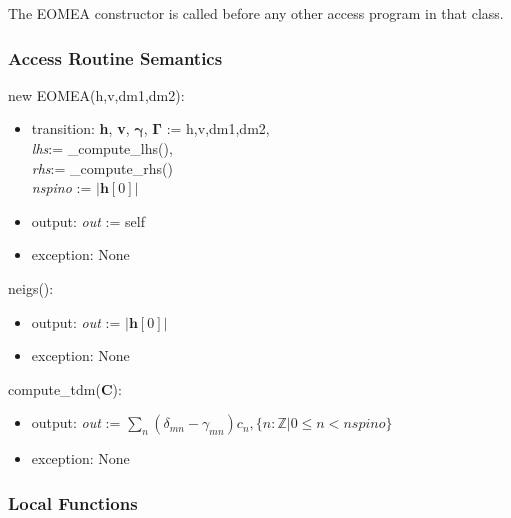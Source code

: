 \documentclass[12pt, titlepage]{article}
\begin{document}
The EOMEA constructor is called before any other access program in that class.

\subsubsection{Access Routine Semantics}

\noindent new EOMEA(h,v,dm1,dm2):
\begin{itemize}
	\item transition: \textbf{h}, \textbf{v}, $\boldsymbol{\gamma}$, 
	$\boldsymbol{\Gamma}$ := h,v,dm1,dm2,\\ \textit{lhs}:= \_compute\_lhs(),\\ 
	\textit{rhs}:= \_compute\_rhs()\\
	\textit{nspino} := $|\boldsymbol{h}[0]|$\\
	\item output: \textit{out} := self 
	\item exception: None
\end{itemize}

\noindent neigs():
\begin{itemize}
	\item output: \textit{out} := $|\boldsymbol{h}[0]|$
	\item exception: None
\end{itemize}

\noindent compute\_tdm(\textbf{C}):
\begin{itemize}
	\item output: \textit{out} := $\sum_{n}(\delta_{mn} - \gamma_{mn}) c_n, 
	\{n:\mathbb{Z}|0 \le n < nspino\}$
	\item exception: None
\end{itemize}

%

\subsubsection{Local Functions}
\end{document}
